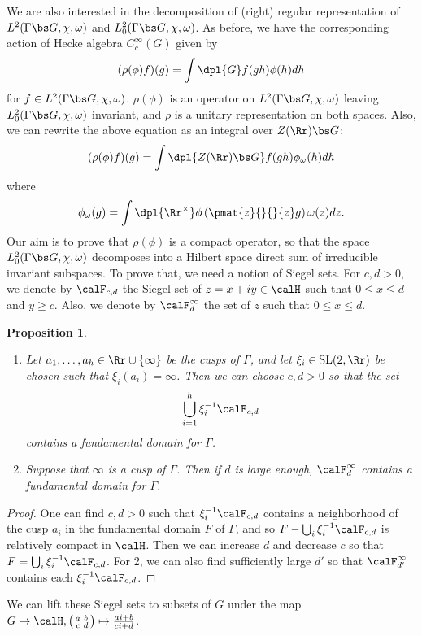 \documentclass{article}
\newcommand{\SL}{\mathrm{SL}}
\newcommand{\smat}[4]{\left(\begin{smallmatrix} #1 & #2 \\ #3 & #4 \end{smallmatrix}\right)}
\newtheorem{proposition}{Proposition}[section]
\begin{document}
We are also interested in the decomposition of (right) regular representation of $L^{2}(\Gamma \bs G, \chi, \omega)$ and $L_{0}^{2}(\Gamma \bs G, \chi, \omega)$. 
As before, we have the corresponding action of Hecke algebra $C_{c}^{\infty}(G)$ given by 
$$
(\rho(\phi)f)(g) = \int\dpl{G} f(gh)\phi(h)dh
$$
for $f\in L^{2}(\Gamma \bs G, \chi, \omega)$. 
$\rho(\phi)$ is an operator on $L^{2}(\Gamma \bs G,\chi, \omega)$ leaving $L^{2}_{0}(\Gamma \bs G, \chi, \omega)$ invariant, and $\rho$ is a unitary representation on both spaces. 
Also, we can rewrite the above equation as an integral over $Z(\Rr)\bs G$:
$$
(\rho(\phi)f)(g) = \int\dpl{Z(\Rr)\bs G} f(gh)\phi_{\omega}(h) dh
$$
where 
$$
\phi_{\omega}(g) = \int\dpl{\Rr^{\times}} \phi\left( \pmat{z}{}{}{z} g\right) \omega(z)dz.
$$
Our aim is to prove that $\rho(\phi)$ is a compact operator, so that the space $L^{2}_{0}(\Gamma \bs G, \chi, \omega)$ decomposes into a Hilbert space direct sum of irreducible invariant subspaces. 
To prove that, we need a notion of Siegel sets. 
For $c, d>0$, we denote by $\calF_{c, d}$ the Siegel set of $z = x+iy\in \calH$ such that $0\leq x\leq d$ and $y\geq c$. 
Also, we denote by $\calF_{d}^{\infty}$ the set of $z$ such that $0\leq x\leq d$. 
\begin{proposition}
\label{siegel}
\begin{enumerate}
\item Let $a_{1}, \dots, a_{h}\in \Rr\cup \{\infty\}$ be the cusps of $\Gamma$, and let $\xi_{i}\in \SL(2, \Rr)$ be chosen such that $\xi_{i}(a_{i}) = \infty$. 
Then we can choose $c, d>0$ so that the set 
$$
\bigcup_{i = 1}^{h} \xi_{i}^{-1}\calF_{c, d}
$$
contains a fundamental domain for $\Gamma$. 
\item Suppose that $\infty$ is a cusp of $\Gamma$. Then if $d$ is large enough, $\calF_{d}^{\infty}$ contains a fundamental domain for $\Gamma$. 
\end{enumerate}
\end{proposition}
\begin{proof}
One can find $c, d>0$ such that $\xi_{i}^{-1}\calF_{c, d}$ contains a neighborhood of the cusp $a_i$ in the fundamental domain $F$ of $\Gamma$, and so $F - \bigcup_{i} \xi_{i}^{-1}\calF_{c, d}$ is relatively compact in $\calH$. 
Then we can increase $d$ and decrease $c$ so that $F = \bigcup_{i} \xi_{i}^{-1} \calF_{c, d}$. 
For 2, we can also find sufficiently large $d'$ so that $\calF_{d'}^{\infty}$ contains each $\xi_{i}^{-1}\calF_{c, d}$. 
\end{proof}
We can lift these Siegel sets to subsets of $G$ under the map $G\to \calH, \smat{a}{b}{c}{d}\mapsto \frac{ai+b}{ci+d}$. 
\end{document}
